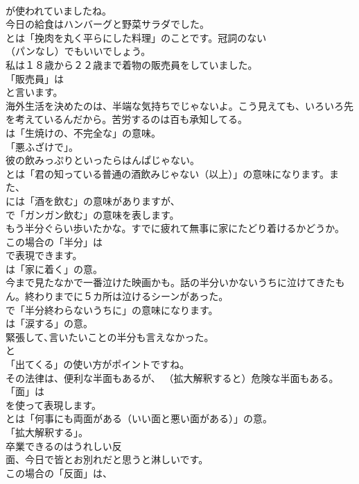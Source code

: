 \documentclass[8pt]{extreport}
\begin{document}
\begin{CJK}{UTF8}{min}
\\	が使われていましたね。	
\\	今日の給食はハンバーグと野菜サラダでした。 
\\	とは「挽肉を丸く平らにした料理」のことです。冠詞のない
\\	（パンなし）でもいいでしょう。	
\\	私は１８歳から２２歳まで着物の販売員をしていました。 
\\	「販売員」は
\\	と言います。	
\\	海外生活を決めたのは、半端な気持ちでじゃないよ。こう見えても、いろいろ先を考えているんだから。苦労するのは百も承知してる。 
\\	は「生焼けの、不完全な」の意味。
\\	「悪ふざけで」。	
\\	彼の飲みっぷりといったらはんぱじゃない。 
\\	とは「君の知っている普通の酒飲みじゃない（以上）」の意味になります。また、
\\	には「酒を飲む」の意味がありますが、
\\	で「ガンガン飲む」の意味を表します。	
\\	もう半分ぐらい歩いたかな。すでに疲れて無事に家にたどり着けるかどうか。 
\\	この場合の「半分」は 
\\	で表現できます。
\\	は「家に着く」の意。	
\\	今まで見たなかで一番泣けた映画かも。話の半分いかないうちに泣けてきたもん。終わりまでに５カ所は泣けるシーンがあった。 
\\	で「半分終わらないうちに」の意味になります。
\\	は「涙する」の意。	
\\	緊張して､言いたいことの半分も言えなかった。 
\\	と
\\	「出てくる」の使い方がポイントですね。	
\\	その法律は、便利な半面もあるが、 （拡大解釈すると）危険な半面もある。 
\\	「面」は
\\	を使って表現します。
\\	とは「何事にも両面がある（いい面と悪い面がある）」の意。
\\	「拡大解釈する」。	
\\	卒業できるのはうれしい反
\\	面、今日で皆とお別れだと思うと淋しいです。 
\\	この場合の「反面」は、

\end{CJK}
\end{document}

